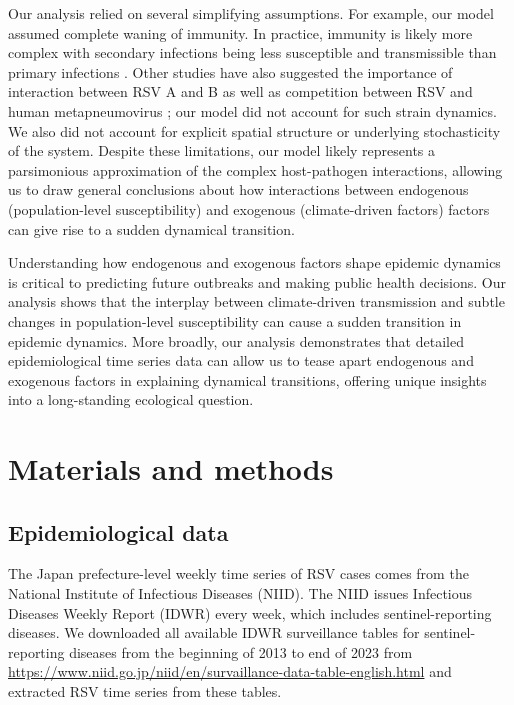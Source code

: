 \documentclass[12pt]{article}
\begin{document}
Our analysis relied on several simplifying assumptions.
For example, our model assumed complete waning of immunity.
In practice, immunity is likely more complex with secondary infections being less susceptible and transmissible than primary infections \citep{pitzer2015environmental}.
Other studies have also suggested the importance of interaction between RSV A and B \citep{white2005transmission,holmdahl2024differential} as well as competition between RSV and human metapneumovirus \citep{bhattacharyya2015cross}; 
our model did not account for such strain dynamics.
We also did not account for explicit spatial structure or underlying stochasticity of the system.
Despite these limitations, our model likely represents a parsimonious approximation of the complex host-pathogen interactions, allowing us to draw general conclusions about how interactions between endogenous (population-level susceptibility) and exogenous (climate-driven factors) factors can give rise to a sudden dynamical transition.

Understanding how endogenous and exogenous factors shape epidemic dynamics is critical to predicting future outbreaks and making public health decisions.
Our analysis shows that the interplay between climate-driven transmission and subtle changes in population-level susceptibility can cause a sudden transition in epidemic dynamics.
More broadly, our analysis demonstrates that detailed epidemiological time series data can allow us to tease apart endogenous and exogenous factors in explaining dynamical transitions, offering unique insights into a long-standing ecological question.

\section*{Materials and methods}

\subsection*{Epidemiological data}

The Japan prefecture-level weekly time series of RSV cases comes from the National Institute of Infectious Diseases (NIID).
The NIID issues Infectious Diseases Weekly Report (IDWR) every week, which includes sentinel-reporting diseases.
We downloaded all available IDWR surveillance tables for sentinel-reporting diseases from the beginning of 2013 to end of 2023 from \url{https://www.niid.go.jp/niid/en/survaillance-data-table-english.html} and extracted RSV time series from these tables.
\end{document}
